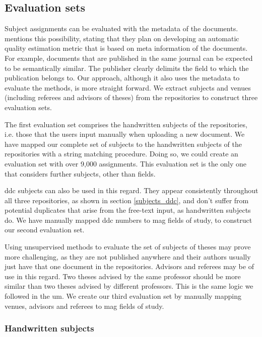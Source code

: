 \subsection{Evaluation sets} \label{eval_datasets}

Subject assignments can be evaluated with the metadata of the documents. \cite{toepfer2020fusion} mentions this possibility, stating that they plan on developing an automatic quality estimation metric that is based on meta information of the documents. For example, documents that are published in the same journal can be expected to be semantically similar. The publisher clearly delimits the field to which the publication belongs to. Our approach, although it also uses the metadata to evaluate the methods, is more straight forward. We extract subjects and venues (including referees and advisors of theses) from the repositories to construct three evaluation sets.

The first evaluation set comprises the handwritten subjects of the repositories, i.e. those that the users input manually when uploading a new document. We have mapped our complete set of subjects to the handwritten subjects of the repositories with a string matching procedure. Doing so, we could create an evaluation set with over 9,000 assignments. This evaluation set is the only one that considers further subjects, other than fields.

\acrshort{ddc} subjects can also be used in this regard. They appear consistently throughout all three repositories, as shown in section \ref{subjects_ddc}, and don't suffer from potential duplicates that arise from the free-text input, as handwritten subjects do. We have manually mapped \acrshort{ddc} numbers to \acrshort{mag} fields of study, to construct our second evaluation set.

Using unsupervised methods to evaluate the set of subjects of theses may prove more challenging, as they are not published anywhere and their authors usually just have that one document in the repositories. Advisors and referees may be of use in this regard. Two theses advised by the same professor should be more similar than two theses advised by different professors. This is the same logic we followed in the \acrfull{um}. We create our third evaluation set by manually mapping venues, advisors and referees to \acrshort{mag} fields of study.

\subsubsection{Handwritten subjects} \label{eval_subjects}

